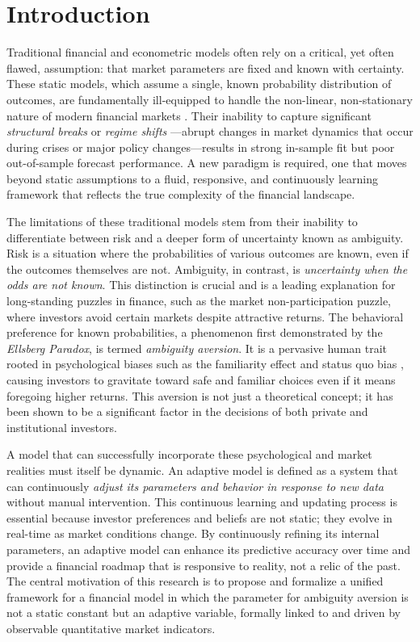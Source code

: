 \documentclass[preprint,12pt,authoryear]{elsarticle}
\begin{document}
\section{Introduction}

Traditional financial and econometric models often rely on a critical, yet often flawed, assumption: that market parameters are fixed and known with certainty. These static models, which assume a single, known probability distribution of outcomes, are fundamentally ill-equipped to handle the non-linear, non-stationary nature of modern financial markets . Their inability to capture significant \textit{structural breaks} or \textit{regime shifts} —abrupt changes in market dynamics that occur during crises or major policy changes—results in strong in-sample fit but poor out-of-sample forecast performance. A new paradigm is required, one that moves beyond static assumptions to a fluid, responsive, and continuously learning framework that reflects the true complexity of the financial landscape.

The limitations of these traditional models stem from their inability to differentiate between risk and a deeper form of uncertainty known as ambiguity. Risk is a situation where the probabilities of various outcomes are known, even if the outcomes themselves are not. Ambiguity, in contrast, is \textit{uncertainty when the odds are not known}. This distinction is crucial and is a leading explanation for long-standing puzzles in finance, such as the market non-participation puzzle, where investors avoid certain markets despite attractive returns. The behavioral preference for known probabilities, a phenomenon first demonstrated by the \textit{Ellsberg Paradox}, is termed \textit{ambiguity aversion}. It is a pervasive human trait rooted in psychological biases such as the familiarity effect and status quo bias , causing investors to gravitate toward safe and familiar choices even if it means foregoing higher returns. This aversion is not just a theoretical concept; it has been shown to be a significant factor in the decisions of both private and institutional investors. 

A model that can successfully incorporate these psychological and market realities must itself be dynamic. An adaptive model is defined as a system that can continuously \textit{adjust its parameters and behavior in response to new data} without manual intervention. This continuous learning and updating process is essential because investor preferences and beliefs are not static; they evolve in real-time as market conditions change. By continuously refining its internal parameters, an adaptive model can enhance its predictive accuracy over time and provide a financial roadmap that is responsive to reality, not a relic of the past. The central motivation of this research is to propose and formalize a unified framework for a financial model in which the parameter for ambiguity aversion is not a static constant but an adaptive variable, formally linked to and driven by observable quantitative market indicators.
\end{document}
